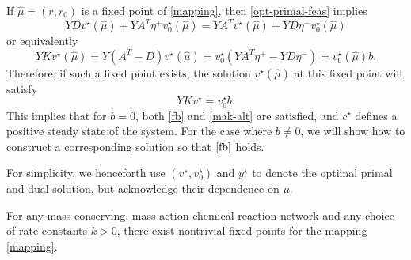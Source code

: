 \documentclass[smallextended]{svjour3}       %
\newcommand*{\0}{\mathbf{0}}
\newcommand*{\1}{\mathbf{1}}
\begin{document}
If $\hat \mu = (r, r_0)$ is a fixed point of \eqref{mapping}, then
\eqref{opt-primal-feas} implies
\[
	 YDv^\star(\hat \mu)+YA^T\eta^+v^\star_0(\hat \mu) = YA^Tv^\star(\hat \mu) +
	 	YD\eta^-v_0^\star(\hat \mu)
\]
or equivalently
\[
    Y K v^\star(\hat \mu) = Y(A^T-D)v^\star(\hat \mu) = v^\star_0(YA^T\eta^+ - 
			YD\eta^-) = v^\star_0(\hat \mu)b.
\]
Therefore, if such a fixed point exists, the solution $v^\star(\hat\mu)$ at this
fixed point will satisfy
\begin{equation}
 YKv^\star=v^\star_0b.
  \label{scaled-fb}
\end{equation}
This implies that for $b=0$, both \eqref{fb} and \eqref{mak-alt} are
satisfied, and $c^\star$ defines a positive steady state of the system. 
For the case where $b\neq 0$, we will show how to construct a 
corresponding solution so that $\eqref{fb}$ holds.

For simplicity, we henceforth use $(v^\star,v^\star_0)$ and 
$y^\star$ to denote the optimal primal and dual solution, but acknowledge their
dependence on $\mu$.

\begin{theorem} 
	\label{fp-exist-map} 
	For any mass-conserving, mass-action chemical reaction network and any choice
	of rate constants $k>0$, there exist nontrivial fixed points for the mapping
	\eqref{mapping}.
\end{theorem} 
\end{document}
